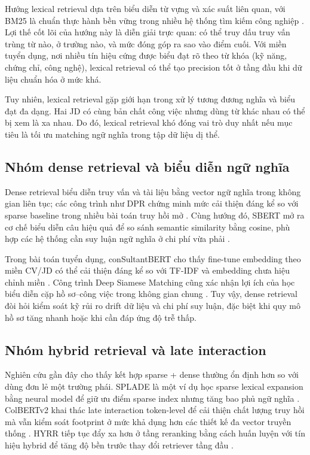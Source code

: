 Hướng lexical retrieval dựa trên biểu diễn từ vựng và xác suất liên quan, với BM25 là chuẩn thực hành bền vững trong nhiều hệ thống tìm kiếm công nghiệp \cite{prf-bm25}. Lợi thế cốt lõi của hướng này là diễn giải trực quan: có thể truy dấu truy vấn trùng từ nào, ở trường nào, và mức đóng góp ra sao vào điểm cuối. Với miền tuyển dụng, nơi nhiều tín hiệu cứng được biểu đạt rõ theo từ khóa (kỹ năng, chứng chỉ, công nghệ), lexical retrieval có thể tạo precision tốt ở tầng đầu khi dữ liệu chuẩn hóa ở mức khá.

Tuy nhiên, lexical retrieval gặp giới hạn trong xử lý tương đương nghĩa và biểu đạt đa dạng. Hai JD có cùng bản chất công việc nhưng dùng từ khác nhau có thể bị xem là xa nhau. Do đó, lexical retrieval khó đóng vai trò duy nhất nếu mục tiêu là tối ưu matching ngữ nghĩa trong tập dữ liệu dị thể.

\subsection{Nhóm dense retrieval và biểu diễn ngữ nghĩa}

Dense retrieval biểu diễn truy vấn và tài liệu bằng vector ngữ nghĩa trong không gian liên tục; các công trình như DPR chứng minh mức cải thiện đáng kể so với sparse baseline trong nhiều bài toán truy hồi mở \cite{dpr}. Cùng hướng đó, SBERT mở ra cơ chế biểu diễn câu hiệu quả để so sánh semantic similarity bằng cosine, phù hợp các hệ thống cần suy luận ngữ nghĩa ở chi phí vừa phải \cite{sbert}.

Trong bài toán tuyển dụng, conSultantBERT cho thấy fine-tune embedding theo miền CV/JD có thể cải thiện đáng kể so với TF-IDF và embedding chưa hiệu chỉnh miền \cite{consultantbert}. Công trình Deep Siamese Matching cũng xác nhận lợi ích của học biểu diễn cặp hồ sơ--công việc trong không gian chung \cite{ibm-siamese-job}. Tuy vậy, dense retrieval đòi hỏi kiểm soát kỹ rủi ro drift dữ liệu và chi phí suy luận, đặc biệt khi quy mô hồ sơ tăng nhanh hoặc khi cần đáp ứng độ trễ thấp.

\subsection{Nhóm hybrid retrieval và late interaction}

Nghiên cứu gần đây cho thấy kết hợp sparse + dense thường ổn định hơn so với dùng đơn lẻ một trường phái. SPLADE là một ví dụ học sparse lexical expansion bằng neural model để giữ ưu điểm sparse index nhưng tăng bao phủ ngữ nghĩa \cite{splade}. ColBERTv2 khai thác late interaction token-level để cải thiện chất lượng truy hồi mà vẫn kiểm soát footprint ở mức khả dụng hơn các thiết kế đa vector truyền thống \cite{colbertv2}. HYRR tiếp tục đẩy xa hơn ở tầng reranking bằng cách huấn luyện với tín hiệu hybrid để tăng độ bền trước thay đổi retriever tầng đầu \cite{hyrr}.

